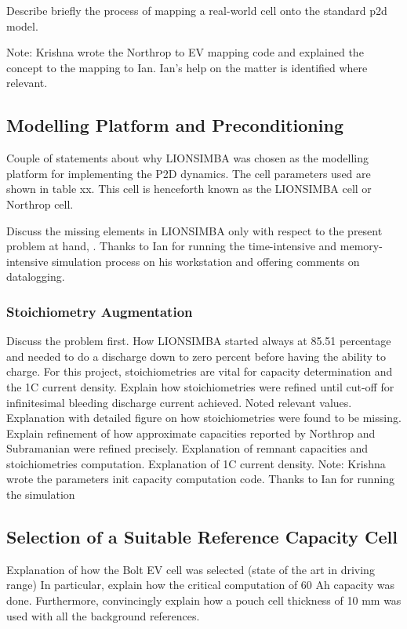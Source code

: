 Describe briefly  the process  of mapping  a real-world  cell onto  the standard
\gls{p2d} model.

Note: Krishna wrote the Northrop to EV mapping code and explained the concept to
the mapping to Ian. Ian's help on the matter is identified where relevant.

\subsection{Modelling Platform and Preconditioning}

Couple of  statements about why LIONSIMBA  was chosen as the  modelling platform
for implementing the  P2D dynamics. The cell parameters used  are shown in table
xx. This cell is henceforth known as the LIONSIMBA cell or Northrop cell.

Discuss  the missing  elements in  LIONSIMBA only  with respect  to the  present
problem  at hand,  .  Thanks to  Ian  for running  the
time-intensive and  memory-intensive simulation  process on his  workstation and
offering comments on datalogging.

\subsubsection*{Stoichiometry Augmentation}
Discuss the problem first. How LIONSIMBA  started always at 85.51 percentage and
needed to  do a  discharge down  to zero  percent before  having the  ability to
charge. For this  project, stoichiometries are vital  for capacity determination
and  the 1C  current density.  Explain  how stoichiometries  were refined  until
cut-off for  infinitesimal bleeding  discharge current achieved.  Noted relevant
values. Explanation with detailed figure on how stoichiometries were found to be
missing. Explain refinement  of how approximate capacities  reported by Northrop
and Subramanian  were refined precisely.  Explanation of remnant  capacities and
stoichiometries computation.  Explanation of  1C current density.  Note: Krishna
wrote the parameters  init capacity computation code. Thanks to  Ian for running
the simulation

\subsection{Selection of a Suitable Reference Capacity Cell}

Explanation of how  the Bolt EV cell  was selected (state of the  art in driving
range) In particular, explain how the critical computation of 60 Ah capacity was
done. Furthermore, convincingly explain how a  pouch cell thickness of 10 mm was
used with all the background references.

